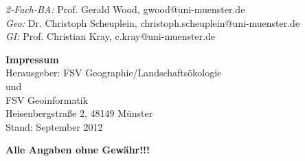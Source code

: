 \begin{tiny}
\begin{minipage}[t]{0.5\textwidth}
\begin{center}
\textit{2-Fach-BA:} Prof. Gerald Wood, gwood@uni-muenster.de\\
\textit{Geo:} Dr. Christoph Scheuplein, christoph.scheuplein@uni-muenster.de\\
\textit{GI:} Prof. Christian Kray, c.kray@uni-muenster.de\\
\bigskip
\bigskip
\end{center}
\end{minipage}
\begin{minipage}{\textwidth}
\hspace{0.08\textwidth}
\hspace{0.18\textwidth}
\end{minipage}
\end{tiny}
\bigskip
\begin{center}
\begin{small}
 \textbf{Impressum} \\ \bigskip
Herausgeber: FSV Geographie/Landschaftsökologie\\
und\\
FSV Geoinformatik\\
Heisenbergstraße 2, 48149 Münster\\
Stand: September 2012 \\
\end{small}
\begin{tiny}
\sffamily
\textbf{Alle Angaben ohne Gewähr!!!}
\end{tiny}
\end{center}
